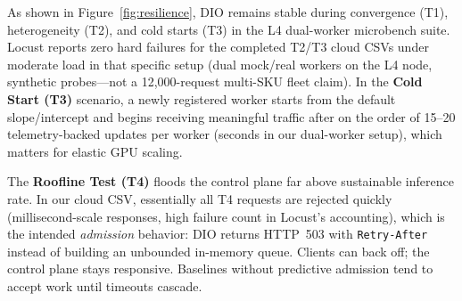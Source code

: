 \documentclass[10pt,twocolumn,letterpaper]{article}
\begin{document}
As shown in Figure~\ref{fig:resilience}, DIO remains stable during convergence (T1), heterogeneity (T2), and cold starts (T3) in the L4 dual-worker microbench suite. Locust reports zero hard failures for the completed T2/T3 cloud CSVs under moderate load in that specific setup (dual mock/real workers on the L4 node, synthetic probes---not a 12{,}000-request multi-SKU fleet claim). In the \textbf{Cold Start (T3)} scenario, a newly registered worker starts from the default slope/intercept and begins receiving meaningful traffic after on the order of 15--20 telemetry-backed updates per worker (seconds in our dual-worker setup), which matters for elastic GPU scaling.

The \textbf{Roofline Test (T4)} floods the control plane far above sustainable inference rate. In our cloud CSV, essentially all T4 requests are rejected quickly (millisecond-scale responses, high failure count in Locust's accounting), which is the intended \emph{admission} behavior: DIO returns HTTP~503 with \texttt{Retry-After} instead of building an unbounded in-memory queue. Clients can back off; the control plane stays responsive. Baselines without predictive admission tend to accept work until timeouts cascade.
\end{document}

